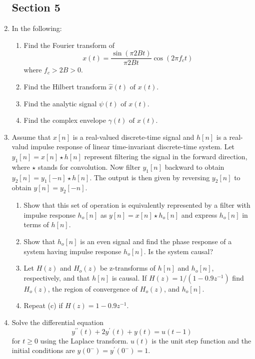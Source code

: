 \documentclass[main.tex]{subfiles}
\begin{document}
\begin{enumerate}
\subsection{Section 5} 

\item In the following:

    \begin{enumerate}
        \item Find the Fourier transform of 
        $$x(t)=\frac{\sin (\pi 2 B t)}{\pi 2 B t} \cos \left(2 \pi f_{c} t\right)$$
        where $f_{c}>2 B>0$.
        \item Find the Hilbert transform $\hat{x}(t) \text { of } x(t)$.
        \item Find the analytic signal $\psi(t) \text { of } x(t)$.
        \item Find the complex envelope $\gamma(t) \text { of } x(t)$.
    \end{enumerate}
    
\item Assume that $x[n]$ is a real-valued discrete-time signal and $h[n]$ is a real-valud impulse response of linear time-invariant discrete-time system. Let $y_{1}[n]=x[n] \star h[n]$ represent filtering the signal in the forward direction, where $\star$ stands for convolution. Now filter $y_{1}[n]$ backward to obtain $y_{2}[n]=y_{1}[-n] \star h[n]$. The output is then given by reversing $y_{2}[n]$ to obtain $y[n]=y_{2}[-n]$.

    \begin{enumerate}
        \item Show that this set of operation is equivalently represented by a filter with impulse response $h_{o}[n]$ as $y[n]=x[n] \star h_{o}[n]$ and express $h_{o}[n]$ in terms of $h[n]$.
        \item Show that $h_{o}[n]$ is an even signal and find the phase response of a system having impulse response $h_{o}[n]$. Is the system causal?
        \item Let $H(z)$ and $H_{o}(z)$ be z-transforms of $h[n]$ and $h_{o}[n]$, respectively, and that $h[n]$ is causal. If $H(z)=1 /\left(1-0.9 z^{-1}\right)$ find $H_{o}(z)$, the region of convergence of $H_{o}(z)$, and $h_{o}[n]$.
        \item Repeat (c) if $H(z)=1-0.9 z^{-1}$.
    \end{enumerate}
    
\item Solve the differential equation
    $$y^{\prime \prime}(t)+2 y^{\prime}(t)+y(t)=u(t-1)$$
for $t \geq 0$ using the Laplace transform. $u(t)$ is the unit step function and the initial conditions are $y\left(0^{-}\right)=y^{\prime}\left(0^{-}\right)=1$.


\end{enumerate}
\end{document}
